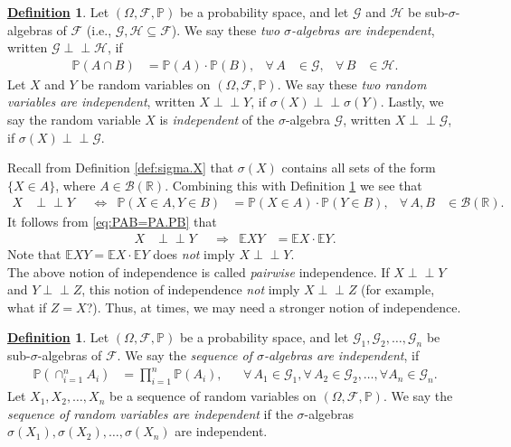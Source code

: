\documentclass[12pt]{book}
\numberwithin{equation}{chapter}
\theoremstyle{plain}
\numberwithin{theorem}{section}
\theoremstyle{definition}
\newtheorem{definition}[theorem]{\underline{Definition}}
\numberwithin{exercise}{chapter}
\newcommand{\<}{\langle}
\renewcommand{\>}{\rangle}
\renewcommand{\(}{\left(}
\renewcommand{\)}{\right)}
\renewcommand{\[}{\left[}
\renewcommand{\]}{\right]}
\newcommand\Eb{\mathds{E}}
\newcommand\Pb{\mathds{P}}
\newcommand\Rb{\mathds{R}}
\newcommand\Bc{\mathscr{B}}
\newcommand\Fc{\mathscr{F}}
\newcommand\Gc{\mathscr{G}}
\newcommand\Hc{\mathscr{H}}
\newcommand\Om{\Omega}
\newcommand\sig{\sigma}
\newcommand{\ind}{\perp \! \! \! \perp}
\begin{document}
\begin{definition}
\label{def:independent.vars}
Let $(\Om,\Fc,\Pb)$  be a probability space, and let $\Gc$ and $\Hc$ be
sub-$\sig$-algebras of $\Fc$ (i.e., $\Gc,\Hc \subseteq \Fc$).  We say these \emph{two $\sig$-algebras are independent}, written $\Gc \ind \Hc$, if 
\begin{align}
\Pb(A \cap B) 
	&= \Pb(A) \cdot \Pb(B) , &
\forall \, A 
	&\in \Gc , &
\forall \, B
	&\in \Hc .
\end{align}
Let  $X$  and  $Y$  be random variables on $(\Om,\Fc,\Pb)$.  We say these \emph{two random variables are independent}, written $X \ind Y$, if $\sig(X) \ind \sig(Y)$.  Lastly, we say the random variable $X$ is \emph{independent} of the $\sig$-algebra $\Gc$, written $X \ind \Gc$, if $\sig(X) \ind \Gc$.
\end{definition}

\noindent
Recall from Definition \ref{def:sigma.X} that $\sig(X)$ contains all sets of the form $\{ X \in A \}$, where $A \in \Bc(\Rb)$.  Combining this with Definition \ref{def:independent.vars} we see that
\begin{align}
X
	&\ind Y  &
	&\Leftrightarrow&
\Pb( X \in A , Y \in B )
	&=	\Pb( X \in A) \cdot \Pb(Y \in B) , &
\forall \, A,B
	&\in \Bc(\Rb) . \label{eq:PAB=PA.PB}
\end{align}
It follows from \eqref{eq:PAB=PA.PB} that
\begin{align}
X
	&\ind Y  &
	&\Rightarrow&
\Eb X Y 
	&=	\Eb X \cdot \Eb Y . \label{eq:EAB=EA.EB}
\end{align}
Note that $\Eb XY = \Eb X \cdot \Eb Y$ does \emph{not} imply $X \ind Y$.
\\[0.5em] 
The above notion of independence is called \emph{pairwise} independence.  If $X \ind Y$ and $Y \ind Z$, this notion of independence \emph{not} imply $X \ind Z$ (for example, what if $Z=X$?).  Thus, at times, we may need a stronger notion of independence.

\begin{definition}
\label{def:ind.strong}
Let $(\Om,\Fc,\Pb)$  be a probability space, and let $\Gc_1, \Gc_2, \ldots , \Gc_n$ be
sub-$\sig$-algebras of $\Fc$.  We say the \emph{sequence of $\sig$-algebras are independent}, if 
\begin{align}
\Pb( \cap_{i=1}^n A_i) 
	&= \prod_{i=1}^n \Pb(A_i) , &
	&\forall \, A_1 \in \Gc_1 , \forall \, A_2 \in \Gc_2, \ldots ,  \forall A_n \in \Gc_n. 
\end{align}
Let  $X_1, X_2, \ldots, X_n$ be a sequence of random variables on $(\Om,\Fc,\Pb)$.  We say the \emph{sequence of random variables are independent} if the $\sig$-algebras $\sig(X_1), \sig(X_2), \ldots, \sig(X_n)$ are independent.
\end{definition}
\end{document}
